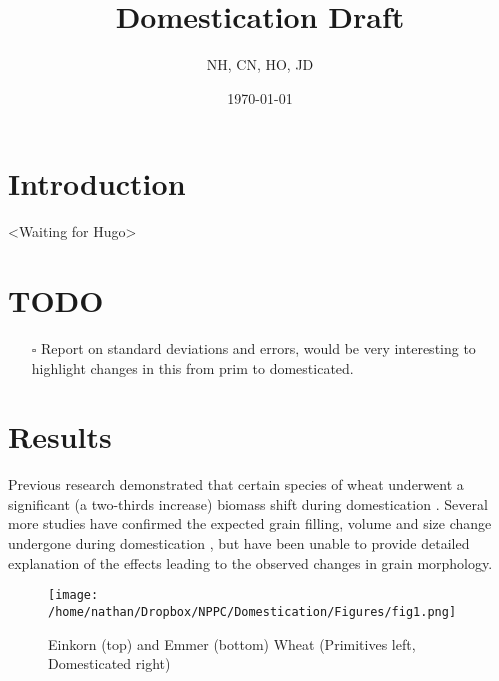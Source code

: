 \documentclass[a4paper, twocolumn]{article}
\author{NH, CN, HO, JD}
\date{\today}
\title{Domestication Draft}
\begin{document}
\maketitle



\section{Introduction}
\label{sec:org1e43827}
<Waiting for Hugo>

\section{{\bfseries\sffamily TODO} }
\label{sec:org48c2e01}

\begin{itemize}
\item[{$\square$}] Report on standard deviations and errors, would be very interesting to highlight changes in this from prim to domesticated.
\end{itemize}

\section{Results}
\label{sec:org0b43068}

Previous research demonstrated that certain species of wheat underwent a significant (a two-thirds increase) biomass shift during domestication \cite{Waines2007}. Several more studies have confirmed the expected grain filling, volume and size change undergone during domestication \cite{Gupta2006,Piperno2004}, but have been unable to provide detailed explanation of the effects leading to the observed changes in grain morphology.

\begin{figure}[htbp]
\centering
\texttt{[image: /home/nathan/Dropbox/NPPC/Domestication/Figures/fig1.png]}
\caption{\label{fig:org29a60ba}
Einkorn (top) and Emmer (bottom) Wheat (Primitives left, Domesticated right)}
\end{figure}
\end{document}
